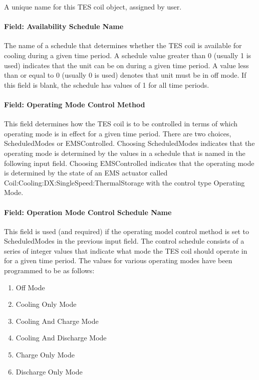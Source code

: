 A unique name for this TES coil object, assigned by user.

\paragraph{Field: Availability Schedule Name}\label{field-availability-schedule-name-15}

The name of a schedule that determines whether the TES coil is available for cooling during a given time period. A schedule value greater than 0 (usually 1 is used) indicates that the unit can be on during a given time period. A value less than or equal to 0 (usually 0 is used) denotes that unit must be in off mode. If this field is blank, the schedule has values of 1 for all time periods.

\paragraph{Field: Operating Mode Control Method}\label{field-operating-mode-control-method}

This field determines how the TES coil is to be controlled in terms of which operating mode is in effect for a given time period. There are two choices, ScheduledModes or EMSControlled. Choosing ScheduledModes indicates that the operating mode is determined by the values in a schedule that is named in the following input field. Choosing EMSControlled indicates that the operating mode is determined by the state of an EMS actuator called Coil:Cooling:DX:SingleSpeed:ThermalStorage with the control type Operating Mode.

\paragraph{Field: Operation Mode Control Schedule Name}\label{field-operation-mode-control-schedule-name}

This field is used (and required) if the operating model control method is set to ScheduledModes in the previous input field. The control schedule consists of a series of integer values that indicate what mode the TES coil should operate in for a given time period. The values for various operating modes have been programmed to be as follows:

\begin{enumerate}
\def\labelenumi{\arabic{enumi}.}
\setcounter{enumi}{-1}
\item
  Off Mode
\item
  Cooling Only Mode
\item
  Cooling And Charge Mode
\item
  Cooling And Discharge Mode
\item
  Charge Only Mode
\item
  Discharge Only Mode
\end{enumerate}


